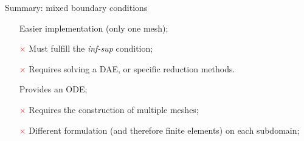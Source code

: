 \documentclass[aspectratio=169]{ISAE-Beamer}
\begin{document}

\begin{frame}{Summary: mixed boundary conditions}

\begin{tcbraster}[raster columns=2, raster equal height]
	\begin{tcolorbox}[width=0.4\textwidth, nobeforeafter, colframe=theme,title=Lagrange multiplier]%
		\begin{itemize}
			\item[\textcolor{green}{\checkmark}] Easier implementation (only one mesh);
			\item[\textcolor{red}{$\times$}] Must fulfill the \textit{inf-sup} condition;	
			\item[\textcolor{red}{$\times$}] Requires solving a DAE, or specific reduction methods.
		\end{itemize}
	\end{tcolorbox} 
	\begin{tcolorbox}[width=0.4\textwidth, nobeforeafter,  colframe=theme,title=Virtual domain decomposition]%
		\begin{itemize}
			\item[\textcolor{green}{\checkmark}] Provides an ODE;
			\item[\textcolor{red}{$\times$}] Requires the construction of multiple meshes;
			\item[\textcolor{red}{$\times$}] Different formulation (and therefore finite elements) on each subdomain;
		\end{itemize}
	\end{tcolorbox}
\end{tcbraster}
\end{frame}
\end{document}

